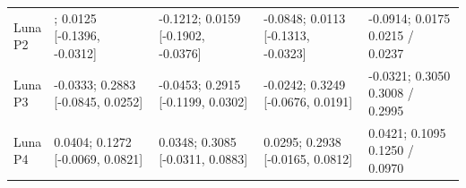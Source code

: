 \begin{table}[tbp]
\begin{tabularx}{\linewidth}{@{}lXXXX@{}}
\shortstack[l]{Luna\\{}P2} & \shortstack[l]{{\bfseries\boldmath -0.0909}; 0.0125\\{}[-0.1396, -0.0312]} & \shortstack[l]{-0.1212; 0.0159\\{}[-0.1902, -0.0376]} & \shortstack[l]{-0.0848; 0.0113\\{}[-0.1313, -0.0323]} & \shortstack[l]{-0.0914; 0.0175\\{}0.0215 / 0.0237} \\
\shortstack[l]{Luna\\{}P3} & \shortstack[l]{-0.0333; 0.2883\\{}[-0.0845, 0.0252]} & \shortstack[l]{-0.0453; 0.2915\\{}[-0.1199, 0.0302]} & \shortstack[l]{-0.0242; 0.3249\\{}[-0.0676, 0.0191]} & \shortstack[l]{-0.0321; 0.3050\\{}0.3008 / 0.2995} \\
\shortstack[l]{Luna\\{}P4} & \shortstack[l]{0.0404; 0.1272\\{}[-0.0069, 0.0821]} & \shortstack[l]{0.0348; 0.3085\\{}[-0.0311, 0.0883]} & \shortstack[l]{0.0295; 0.2938\\{}[-0.0165, 0.0812]} & \shortstack[l]{0.0421; 0.1095\\{}0.1250 / 0.0970} \\
\bottomrule
\end{tabularx}
\end{table}
